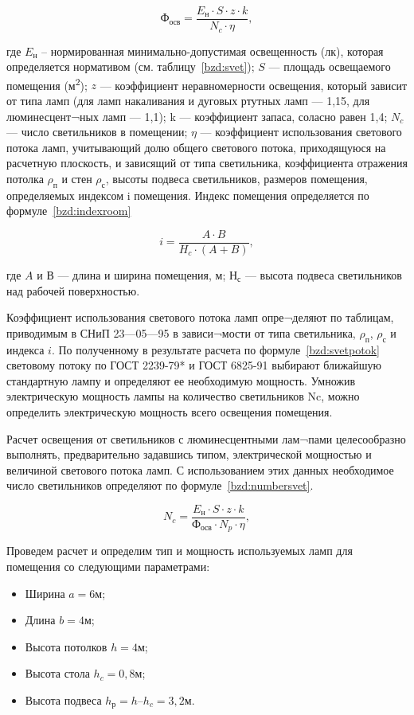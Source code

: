 \begin{equation}\label{bzd:svetpotok}
Ф_{осв}=\frac{E_н \cdot S \cdot z \cdot k}{N_c \cdot \eta},
\end{equation}

где $E_н$ – нормированная минимально-допустимая освещенность (лк), которая определяется нормативом (см. таблицу~\ref{bzd:svet}); $S$ — площадь освещаемого помещения (м\textsuperscript{2}); $z$ — коэффициент неравномерности освещения, который зависит от типа ламп (для ламп накаливания и дуговых ртутных ламп — 1,15, для люминесцент¬ных ламп — 1,1); k — коэффициент запаса, соласно \cite{metodaBZD} равен 1,4; $N_c$ — число светильников в помещении; $\eta$ — коэффициент использования светового потока ламп, учитывающий долю общего светового потока, приходящуюся на расчетную плоскость, и зависящий от типа светильника, коэффициента отражения потолка $\rho_п$ и стен $\rho_с$, высоты подвеса светильников, размеров помещения, определяемых индексом i помещения. Индекс помещения определяется по формуле~\ref{bzd:indexroom}

\begin{equation}\label{bzd:indexroom}
i=\frac{A \cdot B }{H_c \cdot (A + B)},
\end{equation}

где $A$ и $В$ — длина и ширина помещения, м; $Н_с$ — высота подвеса светильников над рабочей поверхностью.

Коэффициент использования светового потока ламп опре¬деляют по таблицам, приводимым в СНиП 23—05—95 в зависи¬мости от типа светильника, $\rho_п$, $\rho_с$ и индекса $i$.
По полученному в результате расчета по формуле~\ref{bzd:svetpotok} световому потоку по ГОСТ 2239-79* и ГОСТ 6825-91 выбирают ближайшую стандартную лампу и определяют ее необходимую мощность. Умножив электрическую мощность лампы на количество светильников Nc, можно определить электрическую мощность всего освещения помещения.

Расчет освещения от светильников с люминесцентными лам¬пами целесообразно выполнять, предварительно задавшись типом, электрической мощностью и величиной светового потока ламп. С использованием этих данных необходимое число светильников определяют по формуле~\ref{bzd:numbersvet}.
 
\begin{equation}\label{bzd:numbersvet}
N_c =\frac{E_н \cdot S \cdot z \cdot k}{Ф_{осв} \cdot N_p \cdot \eta},
\end{equation}

Проведем расчет и определим тип и мощность используемых ламп для помещения со следующими параметрами:
\begin{itemize}
\item Ширина $a = 6 м$;
\item Длина	$b = 4 м$;
\item Высота потолков $h = 4 м$;
\item Высота стола $h_c = 0,8 м$;
\item Высота подвеса	$h_р = h – h_c = 3,2 м$.

\end{itemize}

